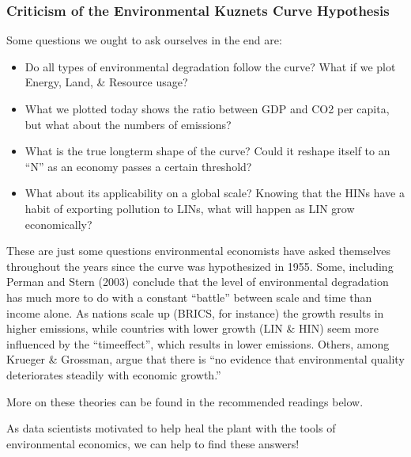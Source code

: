\documentclass[letterpaper,10pt,english]{jupyterBook}
\begin{document}
\subsubsection{Criticism of the Environmental Kuznets Curve Hypothesis}
\label{\detokenize{content/12-environmental/KuznetsHypothesis-Copy1:criticism-of-the-environmental-kuznets-curve-hypothesis}}
\sphinxAtStartPar
Some questions we ought to ask ourselves in the end are:
\begin{itemize}
\item {} 
\sphinxAtStartPar
Do all types of environmental degradation follow the curve? What if we plot Energy, Land, \& Resource usage?

\item {} 
\sphinxAtStartPar
What we plotted today shows the ratio between GDP and CO2 per capita, but what about the  numbers of emissions?

\item {} 
\sphinxAtStartPar
What is the true long\sphinxhyphen{}term shape of the curve? Could it reshape itself to an “N” as an economy passes a certain threshold?

\item {} 
\sphinxAtStartPar
What about its applicability on a global scale? Knowing that the HINs have a habit of exporting pollution to LINs, what will happen as LIN grow economically?

\end{itemize}

\sphinxAtStartPar
These are just some questions environmental economists have asked themselves throughout the years since the curve was hypothesized in 1955. Some, including Perman and Stern (2003) conclude that the level of environmental degradation has much more to do with a constant “battle” between scale and time than income alone. As nations scale up (BRICS, for instance) the growth results in higher emissions, while countries with lower growth (LIN \& HIN) seem more influenced by the “time\sphinxhyphen{}effect”, which results in lower emissions. Others, among Krueger \& Grossman, argue that there is “no evidence that environmental quality deteriorates steadily with economic growth.”

\sphinxAtStartPar
More on these theories can be found in the recommended readings below.

\sphinxAtStartPar
As data scientists motivated to help heal the plant with the tools of environmental economics, we can help to find these answers!
\end{document}
